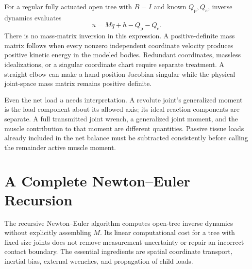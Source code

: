 For a regular fully actuated open tree with $B=I$ and known $Q_{\mathrm{p}},Q_e$,
inverse dynamics evaluates
\begin{equation}
 u=M\ddot q+h-Q_{\mathrm{p}}-Q_e.
 \label{eq:inverse_open}
\end{equation}
There is no mass-matrix inversion in this expression. A positive-definite mass
matrix follows when every nonzero independent coordinate velocity produces
positive kinetic energy in the modeled bodies. Redundant coordinates, massless
idealizations, or a singular coordinate chart require separate treatment. A
straight elbow can make a hand-position Jacobian singular while the physical
joint-space mass matrix remains positive definite.

Even the net load $u$ needs interpretation. A revolute joint's generalized moment
is the load component about its allowed axis; its ideal reaction components
are separate. A full transmitted joint wrench, a generalized joint moment, and
the muscle contribution to that moment are different quantities. Passive tissue
loads already included in the net balance must be subtracted consistently before
calling the remainder active muscle moment.

\section{A Complete Newton--Euler Recursion}
\label{subsec:rnea}

The recursive Newton--Euler algorithm computes open-tree inverse dynamics
without explicitly assembling $M$. Its linear computational cost for a tree
with fixed-size joints does not remove measurement uncertainty or repair an
incorrect contact boundary. The essential ingredients are spatial coordinate
transport, inertial bias, external wrenches, and propagation of child loads.

